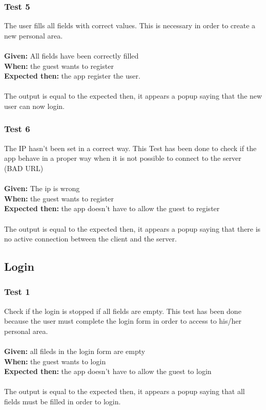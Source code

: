 \subsubsection{\Large{Test 5}}
The user fills all fields with correct values. This is necessary in order to create a new personal area.\\
\\
\textbf{Given: } All fields have been correctly filled\\
\textbf{When: } the guest wants to register\\
\textbf{Expected then: } the app register the user.\\
\\
The output is equal to the expected then, it appears a popup saying that the new user can now login.

\subsubsection{\Large{Test 6}}
The IP hasn't been set in a correct way. This Test has been done to check if the app behave in a proper way when it is not possible to connect to the server (BAD URL)\\
\\
\textbf{Given: } The ip is wrong\\
\textbf{When: } the guest wants to register\\
\textbf{Expected then: } the app doesn't have to allow the guest to register\\
\\
The output is equal to the expected then, it appears a popup saying that there is no active connection between the client and the server.

\subsection{Login}
\subsubsection{\Large{Test 1}}
Check if the login is stopped if all fields are empty. This test has been done because the user must complete the login form in order to access to his/her personal area.\\
\\
\textbf{Given: } all fileds in the login form are empty\\
\textbf{When: } the guest wants to login\\
\textbf{Expected then: } the app doesn't have to allow the guest to login\\
\\
The output is equal to the expected then, it appears a popup saying that all fields must be filled in order to login.

